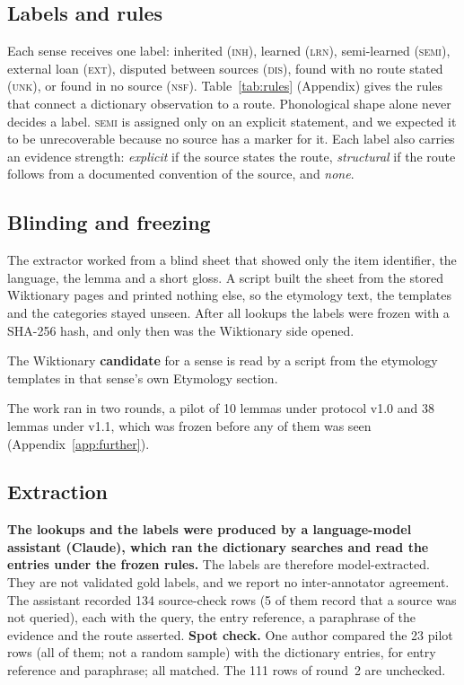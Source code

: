 \documentclass[11pt]{article}
\newcommand{\lbl}[1]{\textsc{#1}}
\begin{document}
\subsection{Labels and rules}

Each sense receives one label: inherited (\lbl{inh}), learned (\lbl{lrn}), semi-learned (\lbl{semi}), external loan (\lbl{ext}), disputed between sources (\lbl{dis}), found with no route stated (\lbl{unk}), or found in no source (\lbl{nsf}). Table~\ref{tab:rules} (Appendix) gives the rules that connect a dictionary observation to a route. Phonological shape alone never decides a label. \lbl{semi} is assigned only on an explicit statement, and we expected it to be unrecoverable because no source has a marker for it. Each label also carries an evidence strength: \textit{explicit} if the source states the route, \textit{structural} if the route follows from a documented convention of the source, and \textit{none}.


\subsection{Blinding and freezing}

The extractor worked from a blind sheet that showed only the item identifier, the language, the lemma and a short gloss. A script built the sheet from the stored Wiktionary pages and printed nothing else, so the etymology text, the templates and the categories stayed unseen. After all lookups the labels were frozen with a SHA-256 hash, and only then was the Wiktionary side opened.

The Wiktionary \textbf{candidate} for a sense is read by a script from the etymology templates in that sense's own Etymology section.

The work ran in two rounds, a pilot of 10 lemmas under protocol v1.0 and 38 lemmas under v1.1, which was frozen before any of them was seen (Appendix~\ref{app:further}).

\subsection{Extraction}
\label{sec:extraction}

\textbf{The lookups and the labels were produced by a language-model assistant (Claude), which ran the dictionary searches and read the entries under the frozen rules.} The labels are therefore model-extracted. They are not validated gold labels, and we report no inter-annotator agreement. The assistant recorded 134 source-check rows (5 of them record that a source was not queried), each with the query, the entry reference, a paraphrase of the evidence and the route asserted. \textbf{Spot check.} One author compared the 23 pilot rows (all of them; not a random sample) with the dictionary entries, for entry reference and paraphrase; all matched. The 111 rows of round~2 are unchecked.
\end{document}
